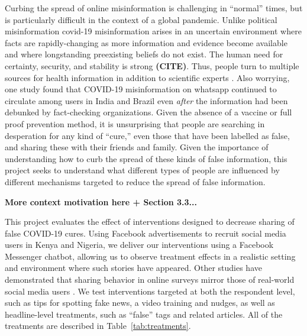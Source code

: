 \documentclass[letterpaper, 12pt, parskip=full,]{scrartcl}
\begin{document}
Curbing the spread of online misinformation is challenging in ``normal'' times, but is particularly difficult in the context of a global pandemic. Unlike political misinformation covid-19 misinformation arises in an uncertain environment where facts are rapidly-changing as more information and evidence become available and where longstanding preexisting beliefs do not exist. %
The human need for certainty, security, and stability is strong \textbf{(CITE)}. Thus, people turn to multiple sources for health information in addition to scientific experts \citep{swire2020public}.  %
Also worrying, one study found that COVID-19 misinformation on whatsapp continued to circulate among users in India and Brazil even \textit{after} the information had been debunked by fact-checking organizations. Given the absence of a vaccine or full proof prevention method, it is unsurprising that people are searching in desperation for any kind of ``cure,'' even those that have been labelled as false, and sharing these with their friends and family. Given the importance of understanding how to curb the spread of these kinds of false information, this project seeks to understand what different types of people are influenced by different mechanisms targeted to reduce the spread of false information.


\textbf{More context motivation here + Section 3.3...}


This project evaluates the effect of interventions designed to decrease sharing of false COVID-19 cures. Using Facebook advertisements to recruit social media users in Kenya and Nigeria, we deliver our interventions using a Facebook Messenger chatbot, allowing us to observe treatment effects in a realistic setting and environment where such stories have appeared. Other studies have demonstrated that sharing behavior in online surveys mirror those of real-world social media users \citep{mosleh2020self}. We test interventions targeted at both the respondent level, such as tips for spotting fake news, a video training and nudges, as well as headline-level treatments, such as ``false'' tags and related articles. All of the treatments are described in Table~\ref{tab:treatments}. 
\end{document}
